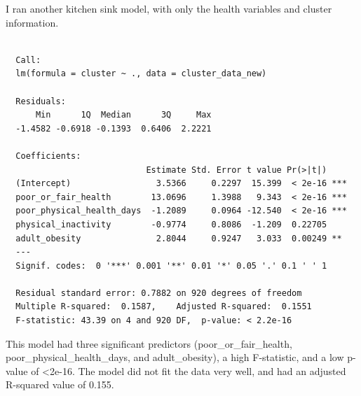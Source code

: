 \documentclass[12pt,twoside]{amherstthesis}
\begin{document}
  \begin{Shaded}
  \end{Shaded}
  
  I ran another kitchen sink model, with only the health variables and
  cluster information.
  
  \begin{Shaded}
  \begin{Highlighting}[]
  \StringTok{ }\OperatorTok{~}
  \end{Highlighting}
  \end{Shaded}
  
  \begin{verbatim}
  
  Call:
  lm(formula = cluster ~ ., data = cluster_data_new)
  
  Residuals:
      Min      1Q  Median      3Q     Max 
  -1.4582 -0.6918 -0.1393  0.6406  2.2221 
  
  Coefficients:
                            Estimate Std. Error t value Pr(>|t|)    
  (Intercept)                 3.5366     0.2297  15.399  < 2e-16 ***
  poor_or_fair_health        13.0696     1.3988   9.343  < 2e-16 ***
  poor_physical_health_days  -1.2089     0.0964 -12.540  < 2e-16 ***
  physical_inactivity        -0.9774     0.8086  -1.209  0.22705    
  adult_obesity               2.8044     0.9247   3.033  0.00249 ** 
  ---
  Signif. codes:  0 '***' 0.001 '**' 0.01 '*' 0.05 '.' 0.1 ' ' 1
  
  Residual standard error: 0.7882 on 920 degrees of freedom
  Multiple R-squared:  0.1587,    Adjusted R-squared:  0.1551 
  F-statistic: 43.39 on 4 and 920 DF,  p-value: < 2.2e-16
  \end{verbatim}
  
  This model had three significant predictors (poor\_or\_fair\_health,
  poor\_physical\_health\_days, and adult\_obesity), a high F-statistic,
  and a low p-value of \textless{}2e-16. The model did not fit the data
  very well, and had an adjusted R-squared value of 0.155.
  
\end{document}
